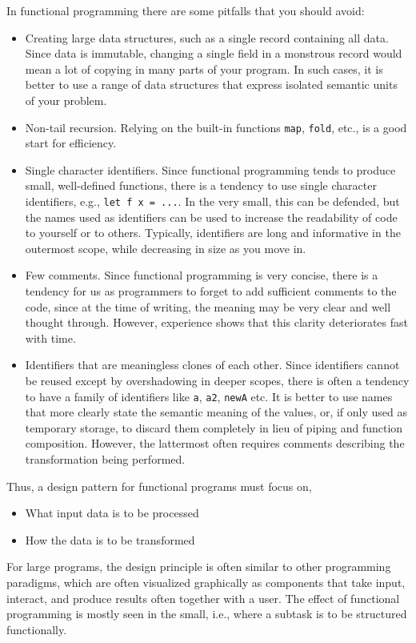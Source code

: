 In functional programming there are some pitfalls that you should avoid:
\begin{itemize}
\item Creating large data structures, such as a single record containing all data. Since data is immutable, changing a single field in a monstrous record would mean a lot of copying in many parts of your program. In such cases, it is better to use a range of data structures that express isolated semantic units of your problem.
\item Non-tail recursion. Relying on the built-in functions \lstinline{map}, \lstinline{fold}, etc., is a good start for efficiency.
\item Single character identifiers. Since functional programming tends to produce small, well-defined functions, there is a tendency to use single character identifiers, e.g., \lstinline{let f x = ...}. In the very small, this can be defended, but the names used as identifiers can be used to increase the readability of code to yourself or to others. Typically, identifiers are long and informative in the outermost scope, while decreasing in size as you move in.
\item Few comments. Since functional programming is very concise, there is a tendency for us as programmers to forget to add sufficient comments to the code, since at the time of writing, the meaning may be very clear and well thought through. However, experience shows that this clarity deteriorates fast with time.
\item Identifiers that are meaningless clones of each other. Since identifiers cannot be reused except by overshadowing in deeper scopes, there is often a tendency to have a family of identifiers like \lstinline{a}, \lstinline{a2}, \lstinline{newA} etc. It is better to use names that more clearly state the semantic meaning of the values, or, if only used as temporary storage, to discard them completely in lieu of piping and function composition. However, the lattermost often requires comments describing the transformation being performed.
\end{itemize}

Thus, a design pattern for functional programs must focus on,
\begin{itemize}
\item What input data is to be processed
\item How the data is to be transformed
\end{itemize}
For large programs, the design principle is often similar to other programming paradigms, which are often visualized graphically as components that take input, interact, and produce results often together with a user. The effect of functional programming is mostly seen in the small, i.e., where a subtask is to be structured functionally.

